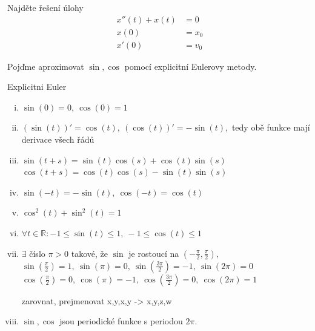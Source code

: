 \begin{úloha}\label{ul:harmonicky oscilator}
  Najděte řešení úlohy
\begin{align*}
	x''(t)+x(t) &= 0 \\
	x(0) &= x_0 \\
	x'(0) &= v_0
\end{align*}
\end{úloha}

Pojďme aproximovat $\sin, \cos$ pomocí explicitní Eulerovy metody.
\begin{Todo}
  Explicitni Euler
\end{Todo}

\begin{věta}\leavevmode
\begin{enumerate}[(i)]
	\item $\sin(0)=0,\ \cos(0)=1$
	\item $(\sin(t))'=\cos(t),\ (\cos(t))'=-\sin(t),$ tedy obě funkce mají derivace všech řádů
	\item $\sin(t+s)=\sin(t)\cos(s)+\cos(t)\sin(s)$ \\
		$\cos(t+s)=\cos(t)\cos(s)-\sin(t)\sin(s)$
	\item $\sin(-t)=-\sin(t),\ \cos(-t)=\cos(t)$
	\item $\cos^{2}(t)+\sin^{2}(t)=1$
	\item $\forall t\in \mathbb{R}\colon -1\leq \sin(t)\leq 1,\ -1\leq \cos(t)\leq 1$
	\item $\exists$ číslo $\pi>0$ takové, že $\sin$ je rostoucí na $(-\frac{\pi}{2},\frac{\pi}{2}),$\\
		$\sin(\frac{\pi}{2})=1,\ \sin(\pi)=0,\ \sin(\frac{3\pi}{2})=-1,\ \sin(2\pi)=0$ \\
		$\cos(\frac{\pi}{2})=0,\ \cos(\pi)=-1,\ \cos(\frac{3\pi}{2})=0,\ \cos(2\pi)=1$
	\begin{Todo}
	  zarovnat, prejmenovat x,y,x,y -> x,y,z,w
	\end{Todo}
	\item $\sin, \cos$ jsou periodické funkce s periodou $2\pi.$
\end{enumerate}
\end{věta}
